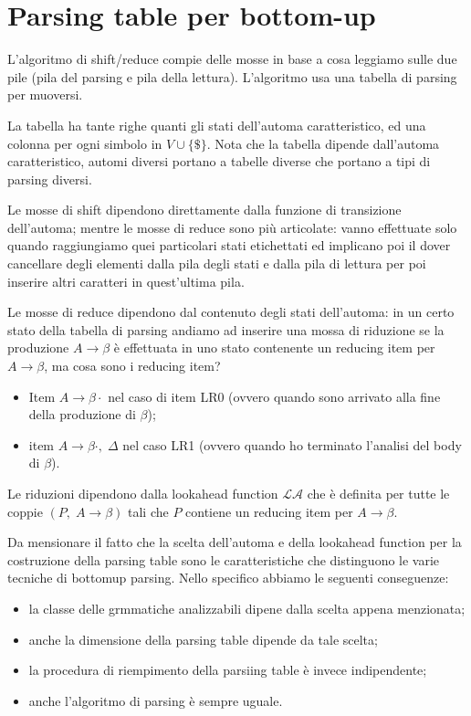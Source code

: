 \documentclass[class=book, crop=false, oneside, 12pt]{standalone}
\begin{document}
\section{Parsing table per bottom-up}

L'algoritmo di shift/reduce compie delle mosse in base a cosa leggiamo sulle due pile (pila del parsing e pila della lettura). L'algoritmo usa una tabella di parsing per muoversi.

La tabella ha tante righe quanti gli stati dell'automa caratteristico, ed una colonna per ogni simbolo in \(V \cup \{ \$ \}\).
Nota che la tabella dipende dall'automa caratteristico, automi diversi portano a tabelle diverse che portano a tipi di parsing diversi.

Le mosse di shift dipendono direttamente dalla funzione di transizione dell'automa; mentre le mosse di reduce sono più articolate: vanno effettuate solo quando raggiungiamo quei particolari stati etichettati ed implicano poi il dover cancellare degli elementi dalla pila degli stati e dalla pila di lettura per poi inserire altri caratteri in quest'ultima pila.

Le mosse di reduce dipendono dal contenuto degli stati dell'automa: in un certo stato della tabella di parsing andiamo ad inserire una mossa di riduzione se la produzione \(A \to \beta\) è effettuata in uno stato contenente un reducing item per \(A \to \beta\), ma cosa sono i reducing item?
\begin{itemize}
    \item Item \(A \to \beta \cdot \) nel caso di item LR0 (ovvero quando sono arrivato alla fine della produzione di \(\beta\));
    \item item \(A \to \beta \cdot, \; \Delta\) nel caso LR1 (ovvero quando ho terminato l'analisi del body di \(\beta\)).
\end{itemize}
Le riduzioni dipendono dalla lookahead function \(\mathcal{LA}\) che è definita per tutte le coppie \((P,\; A \to \beta)\) tali che \(P\) contiene un reducing item per \(A \to \beta\).

Da mensionare il fatto che la scelta dell'automa e della lookahead function per la costruzione della parsing table sono le caratteristiche che distinguono le varie tecniche di bottomup parsing.
Nello specifico abbiamo le seguenti conseguenze:
\begin{itemize}
    \item la classe delle grmmatiche analizzabili dipene dalla scelta appena menzionata;
    \item anche la dimensione della parsing table dipende da tale scelta;
    \item la procedura di riempimento della parsiing table è invece indipendente;
    \item anche l'algoritmo di parsing è sempre uguale.
\end{itemize}
\end{document}
